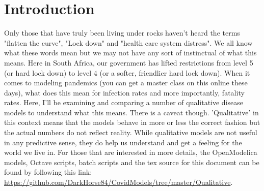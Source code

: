 \section{Introduction}

Only those that have truly been living under rocks haven't heard the terms "flatten the curve", "Lock down" and "health care system distress". We all know what these words mean but we may not have any sort of instinctual of what this means. Here in South Africa, our government has lifted restrictions from level 5 (or hard lock down) to level 4 (or a softer, friendlier hard lock down). When it comes to modeling pandemics (you can get a master class on this online these days), what does this mean for infection rates and more importantly, fatality rates. Here, I'll be examining and comparing a number of qualitative disease models to understand what this means. There is a caveat though. 'Qualitative' in this context means that the models behave in more or less the correct fashion but the actual numbers do not reflect reality. While qualitative models are not useful in any predictive sense, they do help us understand and get a feeling for the world we live in. For those that are interested in more details, the OpenModelica models, Octave scripts, batch scripts and the tex source for this document can be found by following this link: \url{https://github.com/DarkHorse84/CovidModels/tree/master/Qualitative}.